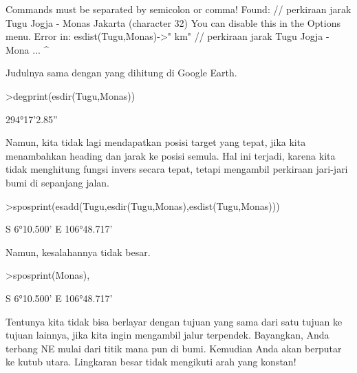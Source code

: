 \documentclass[12pt,arial,letterpaper]{book}
\begin{document}
\begin{eulernootebook}
\begin{eulercomment}
\begin{eulercomment}
\begin{eulernootebook}
\begin{eulercomment}
\begin{eulercomment}
\begin{eulercomment}
\begin{eulercomment}
\begin{eulercomment}
\begin{eulercomment}
\begin{eulernotebook}
\begin{eulercomment}
\begin{eulercomment}
\begin{eulercomment}
\begin{eulercomment}
\begin{eulercomment}
\begin{eulercomment}
\begin{euleroutput}
  Commands must be separated by semicolon or comma!
  Found:  // perkiraan jarak Tugu Jogja - Monas Jakarta (character 32)
  You can disable this in the Options menu.
  Error in:
  esdist(Tugu,Monas)->" km" // perkiraan jarak Tugu Jogja - Mona ...
                           ^
\end{euleroutput}
\begin{eulercomment}
Judulnya sama dengan yang dihitung di Google Earth.
\end{eulercomment}
\begin{eulerprompt}
>degprint(esdir(Tugu,Monas))
\end{eulerprompt}
\begin{euleroutput}
  294°17'2.85''
\end{euleroutput}
\begin{eulercomment}
Namun, kita tidak lagi mendapatkan posisi target yang tepat, jika kita
menambahkan heading dan jarak ke posisi semula. Hal ini terjadi,
karena kita tidak menghitung fungsi invers secara tepat, tetapi
mengambil perkiraan jari-jari bumi di sepanjang jalan.
\end{eulercomment}
\begin{eulerprompt}
>sposprint(esadd(Tugu,esdir(Tugu,Monas),esdist(Tugu,Monas)))
\end{eulerprompt}
\begin{euleroutput}
  S 6°10.500' E 106°48.717'
\end{euleroutput}
\begin{eulercomment}
Namun, kesalahannya tidak besar.
\end{eulercomment}
\begin{eulerprompt}
>sposprint(Monas),
\end{eulerprompt}
\begin{euleroutput}
  S 6°10.500' E 106°48.717'
\end{euleroutput}
\begin{eulercomment}
Tentunya kita tidak bisa berlayar dengan tujuan yang sama dari satu
tujuan ke tujuan lainnya, jika kita ingin mengambil jalur terpendek.
Bayangkan, Anda terbang NE mulai dari titik mana pun di bumi. Kemudian
Anda akan berputar ke kutub utara. Lingkaran besar tidak mengikuti
arah yang konstan!


\end{eulercomment}
\end{eulercomment}
\end{eulercomment}
\end{eulercomment}
\end{eulercomment}
\end{eulercomment}
\end{eulercomment}
\end{eulernotebook}
\end{eulercomment}
\end{eulercomment}
\end{eulercomment}
\end{eulercomment}
\end{eulercomment}
\end{eulercomment}
\end{eulernootebook}
\end{eulercomment}
\end{eulercomment}
\end{eulernootebook}
\end{document}
